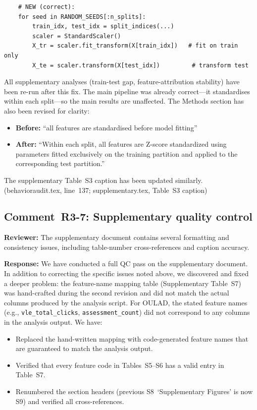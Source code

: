\documentclass[10pt,letterpaper]{article}
\begin{document}
\begin{verbatim}
    # NEW (correct):
    for seed in RANDOM_SEEDS[:n_splits]:
        train_idx, test_idx = split_indices(...)
        scaler = StandardScaler()
        X_tr = scaler.fit_transform(X[train_idx])   # fit on train only
        X_te = scaler.transform(X[test_idx])         # transform test
\end{verbatim}

All supplementary analyses (train-test gap, feature-attribution
stability) have been re-run after this fix.  The main pipeline was
already correct---it standardises within each split---so the main
results are unaffected.  The Methods section has also been revised for
clarity:

\begin{itemize}
\item \textbf{Before:} ``all features are standardised before model
  fitting''
  \item \textbf{After:} ``Within each split, all features are Z-score
  standardized using parameters fitted exclusively on the training
  partition and applied to the corresponding test partition.''
\end{itemize}

The supplementary Table~S3 caption has been updated similarly.
(behavioraudit.tex, line~137; supplementary.tex, Table~S3 caption)

\subsection*{Comment~R3-7: Supplementary quality control}

\textbf{Reviewer:} The supplementary document contains several
formatting and consistency issues, including table-number cross-references
and caption accuracy.

\textbf{Response:} We have conducted a full QC pass on the supplementary
document.  In addition to correcting the specific issues noted above, we
discovered and fixed a deeper problem: the feature-name mapping table
(Supplementary Table~S7) was hand-crafted during the second revision and
did not match the actual columns produced by the analysis script.  For
OULAD, the stated feature names (e.g., \texttt{vle\_total\_clicks},
\texttt{assessment\_count}) did not correspond to any columns in the
analysis output.  We have:

\begin{itemize}
\item Replaced the hand-written mapping with code-generated feature names
  that are guaranteed to match the analysis output.
\item Verified that every feature code in Tables~S5--S6 has a valid entry
  in Table~S7.
\item Renumbered the section headers (previous S8~`Supplementary Figures'
  is now S9) and verified all cross-references.
\end{itemize}
\end{document}
